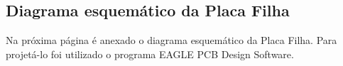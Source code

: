 \documentclass[
	12pt,				%
	openright,			%
	twoside,			%
	a4paper,			%
	english,			%
	french,				%
	spanish,			%
	brazil				%
	]{abntex2}
\begin{document}



%
%


\begin{apendicesenv}

\partapendices

\chapter{Diagrama esquemático da Placa Filha}

Na próxima página é anexado o diagrama esquemático da Placa Filha. Para projetá-lo foi utilizado o programa EAGLE PCB Design Software.



\end{apendicesenv}

\iffalse


\begin{anexosenv}

\partanexos

\chapter{Morbi ultrices rutrum lorem.}
\lipsum[30]

\chapter{Cras non urna sed feugiat cum sociis natoque penatibus et magnis dis
parturient montes nascetur ridiculus mus}

\lipsum[31]

\chapter{Fusce facilisis lacinia dui}

\lipsum[32]

\end{anexosenv}

\fi

\printindex


\end{document}
